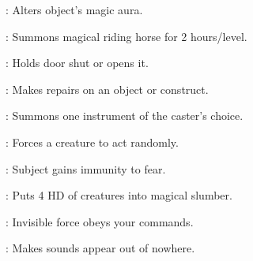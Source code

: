 \begin{list}{}{\leftmargin=1em}
\item {}: Alters object's magic aura.
\item {}: Summons magical riding horse for 2 hours/level.
\item {}: Holds door shut or opens it.
\item {}: Makes repairs on an object or construct.
\item {}: Summons one instrument of the caster's choice.
\item {}: Forces a creature to act randomly.
\item {}: Subject gains immunity to fear.
\item {}: Puts 4 HD of creatures into magical slumber.
\item {}: Invisible force obeys your commands.
\item {}: Makes sounds appear out of nowhere.
\end{list}
